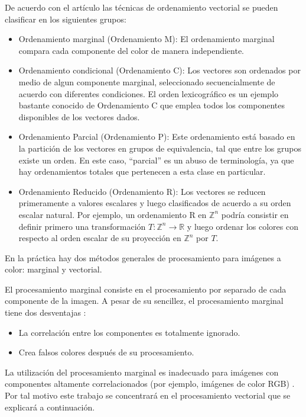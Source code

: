 De acuerdo con el art\'iculo \cite{barnett1976ordering} las t\'ecnicas de ordenamiento vectorial se pueden clasificar en los siguientes grupos:
\begin{itemize}
\item Ordenamiento marginal (Ordenamiento M): El ordenamiento marginal compara cada componente del color de manera independiente.
\item Ordenamiento condicional (Ordenamiento C): Los vectores son ordenados por medio de algun componente marginal, seleccionado secuencialmente de acuerdo con diferentes condiciones. El orden lexicogr\'afico es un ejemplo bastante conocido de Ordenamiento C que emplea todos los componentes disponibles de los vectores dados.
\item Ordenamiento Parcial (Ordenamiento P): Este ordenamiento est\'a basado en la partici\'on de los vectores en grupos de equivalencia, tal que entre los grupos existe un orden. En este caso, ``parcial'' es un abuso de terminolog\'ia, ya que hay ordenamientos totales que pertenecen a esta clase en particular. 
\item Ordenamiento Reducido (Ordenamiento R): Los vectores se reducen primeramente a valores escalares y luego clasificados de acuerdo a su orden escalar natural. Por ejemplo, un ordenamiento R en $\mathbb{Z}^n$ podr\'ia consistir en definir primero una transformaci\'on $T:\mathbb{Z}^n\rightarrow \mathbb{R}$ y luego ordenar los colores con respecto al orden escalar de su proyecci\'on en $\mathbb{Z}^n$ por $T$.
\end{itemize}

En la pr\'actica hay dos m\'etodos generales de procesamiento para im\'agenes a color: marginal y vectorial.

El procesamiento marginal consiste en el procesamiento por separado de cada componente de la imagen. A pesar de su sencillez, el procesamiento marginal tiene dos desventajas \cite{aptoula2007comparative}: 
\begin{itemize}
    \item La correlaci\'on entre los componentes es totalmente ignorado.
    \item Crea falsos colores despu\'es de su procesamiento.
\end{itemize}

La utilizaci\'on del procesamiento marginal es inadecuado para im\'agenes con componentes altamente correlacionados (por ejemplo, im\'agenes de color RGB) \cite{astola1990vector}. Por tal motivo este trabajo se concentrar\'a en el procesamiento vectorial que se explicar\'a a continuaci\'on. 

